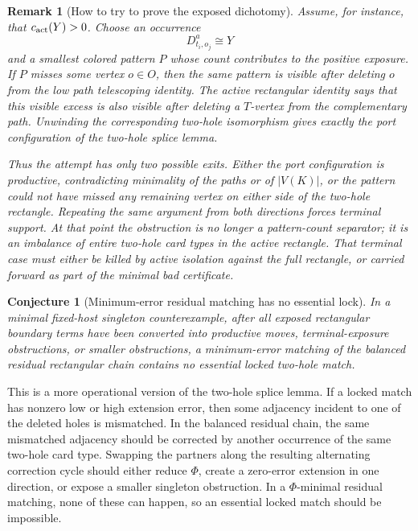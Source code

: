 \documentclass[11pt]{article}
\newtheorem{conjecture}{Conjecture}
\newtheorem{remark}{Remark}
\begin{document}
\begin{remark}[How to try to prove the exposed dichotomy]
Assume, for instance, that \(c_{\rm act}(Y)>0\).  Choose an occurrence
\[
  D_{t_i,o_j}^a\cong Y
\]
and a smallest colored pattern \(P\) whose count contributes to the positive
exposure.  If \(P\) misses some vertex \(o\in O\), then the same pattern is
visible after deleting \(o\) from the low path telescoping identity.  The
active rectangular identity says that this visible excess is also visible
after deleting a \(T\)-vertex from the complementary path.  Unwinding the
corresponding two-hole isomorphism gives exactly the port configuration of the
two-hole splice lemma.

Thus the attempt has only two possible exits.  Either the port configuration
is productive, contradicting minimality of the paths or of \(|V(K)|\), or the
pattern could not have missed any remaining vertex on either side of the
two-hole rectangle.  Repeating the same argument from both directions forces
terminal support.  At that point the obstruction is no longer a pattern-count
separator; it is an imbalance of entire two-hole card types in the active
rectangle.  That terminal case must either be killed by active isolation
against the full rectangle, or carried forward as part of the minimal bad
certificate.
\end{remark}

\begin{conjecture}[Minimum-error residual matching has no essential lock]
In a minimal fixed-host singleton counterexample, after all exposed
rectangular boundary terms have been converted into productive moves,
terminal-exposure obstructions, or smaller obstructions, a minimum-error
matching of the balanced residual rectangular chain contains no essential
locked two-hole match.
\end{conjecture}

This is a more operational version of the two-hole splice lemma.  If a
locked match has nonzero low or high extension error, then some adjacency
incident to one of the deleted holes is mismatched.  In the balanced residual
chain, the same mismatched adjacency should be corrected by another occurrence
of the same two-hole card type.  Swapping the partners along the resulting
alternating correction cycle should either reduce \(\Phi\), create a
zero-error extension in one direction, or expose a smaller singleton
obstruction.  In a \(\Phi\)-minimal residual matching, none of these can
happen, so an essential locked match should be impossible.
\end{document}
